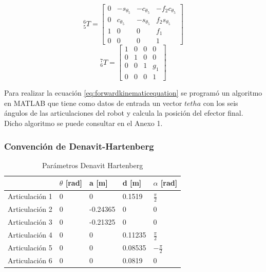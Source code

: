 \begin{multicols}{2}
\[
{}_{5}^{6}T = 
\begin{bmatrix}
    0 & -s_{\theta_5} & -c_{\theta_5} & -f_{2}c_{\theta_5}  \\
    0 & c_{\theta_5} & -s_{\theta_5} & f_{2}s_{\theta_5} \\
    1 & 0 & 0 & f_1 \\
    0 & 0 & 0 & 1
\end{bmatrix}
\]
\[
{}_{6}^{7}T = 
\begin{bmatrix}
    1 & 0 & 0 & 0 \\
    0 & 1 & 0 & 0 \\
    0 & 0 & 1 & {g}_1 \\
    0 & 0 & 0 & 1
\end{bmatrix}
\]

\end{multicols}

Para realizar la ecuación \ref{eq:forwardkinematicequation} se programó un algoritmo en MATLAB que tiene como datos de entrada un vector $tetha$ con los seis ángulos de las articulaciones del robot y calcula la posición del efector final. Dicho algoritmo se puede consultar en el Anexo 1.



\subsubsection{Convención de Denavit-Hartenberg}


\begin{table}[h]
\centering
\caption{Parámetros Denavit Hartenberg}
 \label{table:denavithartenberg}
\begin{tabular}{l|l|l|l|l|}
               & $\theta$ [rad] & a [m]    & d [m]   & $\alpha$ [rad]                        \\ 
\hline
Articulación 1 & 0                           & 0        & 0.1519  & $\frac{\pi}{2}$   \\
Articulación 2 & 0                           & -0.24365 & 0       & 0                                                  \\
Articulación 3 & 0                           & -0.21325 & 0       & 0                                                  \\
Articulación 4 & 0                           & 0        & 0.11235 & $\frac{\pi}{2}$   \\
Articulación 5 & 0                           & 0        & 0.08535 & $-\frac{\pi}{2}$  \\
Articulación 6 & 0                           & 0        & 0.0819  & 0                                                 
\end{tabular}
\end{table}

